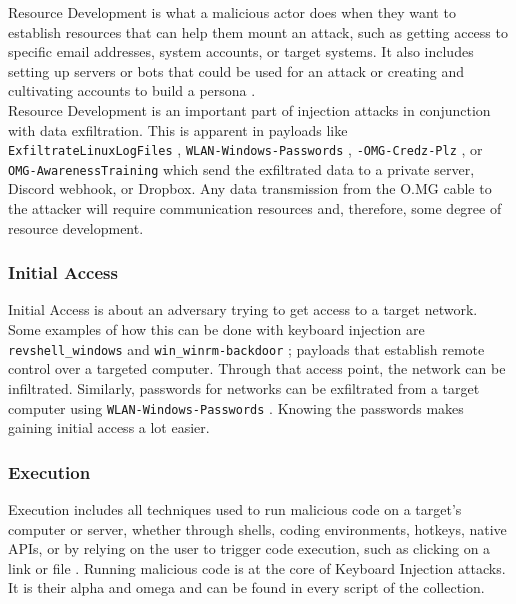 Resource Development is what a malicious actor does when they want to establish resources that can help them mount an attack, such as getting access to specific email addresses,
system accounts, or target systems. It also includes setting up servers or bots that could be used for an attack or creating and cultivating accounts to build a persona \cite{MITREATTCK}.\\
Resource Development is an important part of injection attacks in conjunction with data exfiltration. This is apparent in payloads like
\verb|ExfiltrateLinuxLogFiles| \cite{OmgpayloadsPayloadsLibrary}, \verb|WLAN-Windows-Passwords| \cite{OmgpayloadsPayloadsLibrary}, \verb|-OMG-Credz-Plz|
\cite{OmgpayloadsPayloadsLibrary}, or \verb|OMG-AwarenessTraining| \cite{OmgpayloadsPayloadsLibrary} which send the exfiltrated data to a private server, Discord webhook, or Dropbox.
Any data transmission from the O.MG cable to the attacker will require communication resources and, therefore, some degree of resource development.


\subsubsection{Initial Access}

Initial Access is about an adversary trying to get access to a target network\cite{MITREATTCK}. Some examples of how this can be done with keyboard injection are
\verb|revshell_windows| and \verb|win_winrm-backdoor| \cite{OmgpayloadsPayloadsLibrary}; payloads that establish remote control over a targeted computer.
Through that access point, the network can be infiltrated. Similarly, passwords for networks can be exfiltrated from a target computer using \verb|WLAN-Windows-Passwords|
\cite{OmgpayloadsPayloadsLibrary}. Knowing the passwords makes gaining initial access a lot easier. \\

\subsubsection{Execution}

Execution includes all techniques used to run malicious code on a target's computer or server, whether through shells, coding environments, hotkeys, native APIs, or by relying on the user to trigger code execution, such as clicking on a link or file \cite{MITREATTCK}. 
Running malicious code is at the core of Keyboard Injection attacks. It is their alpha and omega and can be found in every script of the collection.


